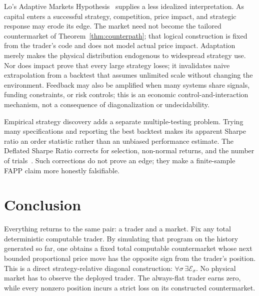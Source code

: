 \documentclass[aps,pra,reprint,superscriptaddress,amsmath,amssymb,floatfix]{revtex4-2}
\theoremstyle{plain}
\theoremstyle{definition}
\theoremstyle{remark}
\begin{document}
Lo's Adaptive Markets Hypothesis~\cite{Lo2004} supplies a less idealized
interpretation. As capital enters a successful strategy, competition, price
impact, and strategic response may erode its edge. The market need not become
the tailored countermarket of Theorem~\ref{thm:counterpath}; that logical
construction is fixed from the trader's code and does not model actual price
impact. Adaptation merely makes the physical distribution endogenous to
widespread strategy use. Nor does impact prove that every large strategy
loses; it invalidates naive extrapolation from a backtest that assumes
unlimited scale without changing the environment. Feedback may also be
amplified when many systems share signals, funding constraints, or risk
controls; this is an economic control-and-interaction mechanism, not a
consequence of diagonalization or undecidability.

Empirical strategy discovery adds a separate multiple-testing problem. Trying
many specifications and reporting the best backtest makes its apparent Sharpe
ratio an order statistic rather than an unbiased performance estimate. The
Deflated Sharpe Ratio corrects for selection, non-normal returns, and the
number of trials~\cite{BaileyLopez2014}. Such corrections do not prove an edge;
they make a finite-sample FAPP claim more honestly falsifiable.

\section{Conclusion}
\label{sec:conclusion}

Everything returns to the same pair: a trader and a market. Fix any total
deterministic computable trader. By simulating that program on the history
generated so far, one obtains a fixed total computable countermarket whose
next bounded proportional price move has the opposite sign from the trader's
position. This is a direct strategy-relative diagonal construction:
\(\forall\sigma\,\exists\mathcal E_\sigma\). No physical market has to observe
the deployed trader. The always-flat trader earns zero, while every nonzero
position incurs a strict loss on its constructed countermarket.
\end{document}
